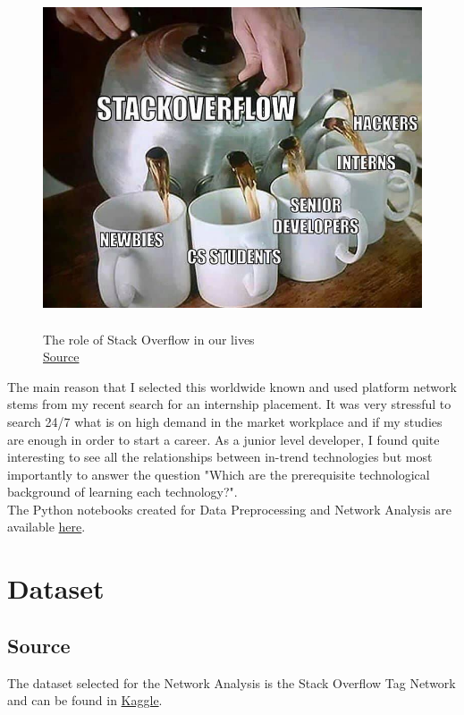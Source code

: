 \documentclass[12pt]{article}
\begin{document}
		\begin{figure}[ht]
			\centering
		\includegraphics[width=12cm,height=10cm]{stackoverflowfun}
		\caption{The role of Stack Overflow in our lives\\
		\tiny \href{https://www.reddit.com/r/ProgrammerHumor/comments/bvx7vv/stackoverflow_is_for_eaveryone/}{Source}}
	\end{figure}
	\FloatBarrier
	The main reason that I selected this worldwide known and used platform network stems from my recent search for an internship placement. It was very stressful to search 24/7 what is on high demand in the market workplace and if my studies are enough in order to start a career. As a junior level developer, I found quite interesting to see all the relationships between in-trend technologies but most importantly to answer the question "Which are the prerequisite technological background of learning each technology?".\\
	The Python notebooks created for Data Preprocessing and Network Analysis are available \href{https://github.com/Rafaila98/Stack-Overflow-Tag-Network}{here}. 
	
\section{Dataset}

	\subsection{Source}
		The dataset selected for the Network Analysis is the Stack Overflow Tag Network and can be found in \href{https://www.kaggle.com/stackoverflow/stack-overflow-tag-network}{Kaggle}.
	
\end{document}
